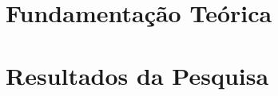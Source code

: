 \documentclass
[
  12pt,      %
  openright, %
  twoside,   %
  a4paper,   %
  brazil     %
]{cls/tccUFRB}
\begin{document}
%
  \frenchspacing %
%
%  
%
%  
  \textual 
% 
%
  \part{Fundamentação Teórica}
%
%
  \part{Resultados da Pesquisa}
%
% 
% 
%
% 
  \postextual
%
  \nocite{*} %
  \printbibliography %
%
  
%
   
\end{document}
